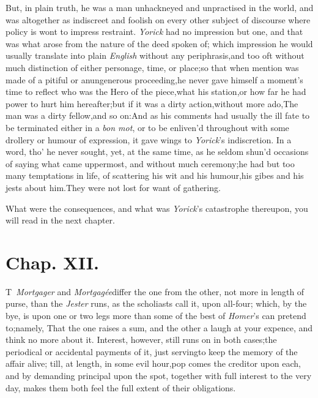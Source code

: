 \documentclass{article}
\begin{document}
But, in plain truth, he was a man unhackneyed and unpractised in
the world, and was altogether as indiscreet and foolish on every
other subject of discourse where policy is wont to impress
restraint. \textit{Yorick} had no impression but one, and that was
what arose from the nature of the deed spoken of; which impression
he would usually translate into plain \textit{English} without any
periphrasis,\tsk  and too oft without much distinction of either
personage, time, or place;\tsk  so that when mention was made of a
pitiful or an\pb ungenerous proceeding,\tsh  he never gave
himself a moment’s time to reflect who was the Hero of the
piece,\tsh  what his station,\tsh  or how far he
had power to hurt him hereafter;\tsk  but if it was a dirty
action,\tsk  without more ado,\tsk  The man was a dirty
fellow,\tsk  and so on:\tsk\break  And as his comments had usually the
ill fate to be terminated either in a \textit{bon mot}, or to be
enliven’d throughout with some drollery or humour of expression, it
gave wings to \textit{Yorick}’s indiscretion. In a word,
tho’ he never sought, yet, at the same time, as he seldom
shun’d occasions of saying what came uppermost, and without much
ceremony;\tsk  he had but too many temptations in life, of
scattering his wit and his humour,\tsk  his gibes and his jests
about him.\tsh  They were not lost for want of
gathering.

\newpage
What were the consequences, and what was \textit{Yorick}’s
catastrophe thereupon, you will read in the next chapter.

\vfill

\section{Chap. XII.}

\lettrine{T}{\,} \textit{Mortgager} and
\textit{Mortgagée}\break differ the one from the other, not more in length
of purse, than the \textit{Jester} 
runs, as the
scholiasts call it, upon all-four; which, by the bye, is upon one
or two legs more than some of the best of \textit{Homer}’s can
pretend to;\tsk  namely, That the one raises a sum, and the other
a laugh at your expence, and think no more about it. Interest,
however, still runs on in both cases;\tsk  the periodical or
accidental payments of it, just serving\pb to keep the memory of the
affair alive; till, at length, in some evil hour,\tsk pop comes the
creditor upon each, and by demanding principal upon the spot,
together with full interest to the very day, makes them both feel
the full extent of their obligations.
\end{document}
